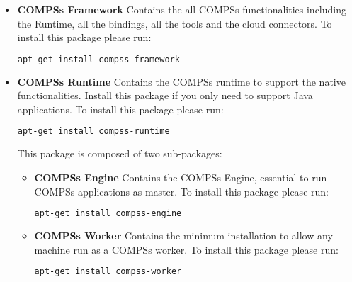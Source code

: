 \begin{itemize}
 \item \textbf{COMPSs Framework} \newline
       Contains the all COMPSs functionalities including the Runtime, all the bindings, all the tools and the cloud connectors.
       \newline
       To install this package please run:
       \begin{lstlisting}[language=bash]
	  apt-get install compss-framework
       \end{lstlisting}
 \item \textbf{COMPSs Runtime} \newline
       Contains the COMPSs runtime to support the native functionalities. Install this package if you only need to support Java
       applications.
       \newline
       To install this package please run:
       \begin{lstlisting}[language=bash]
	  apt-get install compss-runtime
       \end{lstlisting}
       This package is composed of two sub-packages:
       \begin{itemize}
        \item \textbf{COMPSs Engine} \newline
	      Contains the COMPSs Engine, essential to run COMPSs applications as master.
	      \newline
	      To install this package please run:
	      \begin{lstlisting}[language=bash]
		  apt-get install compss-engine
	      \end{lstlisting}
        \item \textbf{COMPSs Worker} \newline
              Contains the minimum installation to allow any machine run as a COMPSs worker.
              \newline
              To install this package please run:
	      \begin{lstlisting}[language=bash]
		  apt-get install compss-worker
	      \end{lstlisting}
       \end{itemize}


\end{itemize}
